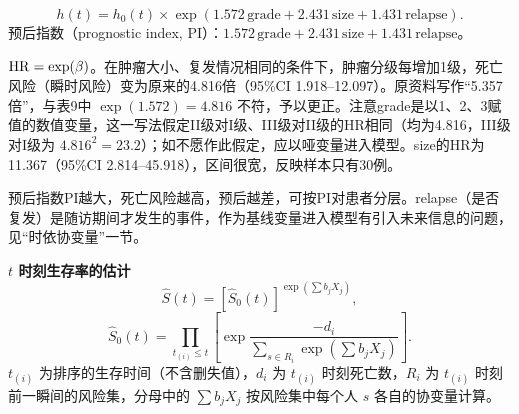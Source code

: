 \[
h(t)=h_0(t)\times\exp(1.572\,\mathrm{grade}+2.431\,\mathrm{size}+1.431\,\mathrm{relapse}).
\]
预后指数（prognostic index, PI）：$1.572\,\mathrm{grade}+2.431\,\mathrm{size}+1.431\,\mathrm{relapse}$。
\begin{annotation}
$\operatorname{HR}=\exp(\beta)$。在肿瘤大小、复发情况相同的条件下，肿瘤分级每增加1级，死亡风险（瞬时风险）变为原来的4.816倍（95\%CI 1.918--12.097）。原资料写作“5.357倍”，与表9中 $\exp(1.572)=4.816$ 不符，予以更正。注意grade是以1、2、3赋值的数值变量，这一写法假定II级对I级、III级对II级的HR相同（均为4.816，III级对I级为 $4.816^2=23.2$）；如不愿作此假定，应以哑变量进入模型。size的HR为11.367（95\%CI 2.814--45.918），区间很宽，反映样本只有30例。

预后指数PI越大，死亡风险越高，预后越差，可按PI对患者分层。relapse（是否复发）是随访期间才发生的事件，作为基线变量进入模型有引入未来信息的问题，见“时依协变量”一节。
\end{annotation}
\textbf{$t$ 时刻生存率的估计}
\[
\widehat S(t)=[\widehat S_0(t)]^{\exp(\sum b_jX_j)},
\]
\[
\widehat S_0(t)=\prod_{t_{(i)}\le t}\left[\exp\frac{-d_i}{\sum_{s\in R_i}\exp(\sum b_jX_j)}\right].
\]
$t_{(i)}$ 为排序的生存时间（不含删失值），$d_i$ 为 $t_{(i)}$ 时刻死亡数，$R_i$ 为 $t_{(i)}$ 时刻前一瞬间的风险集，分母中的 $\sum b_jX_j$ 按风险集中每个人 $s$ 各自的协变量计算。
